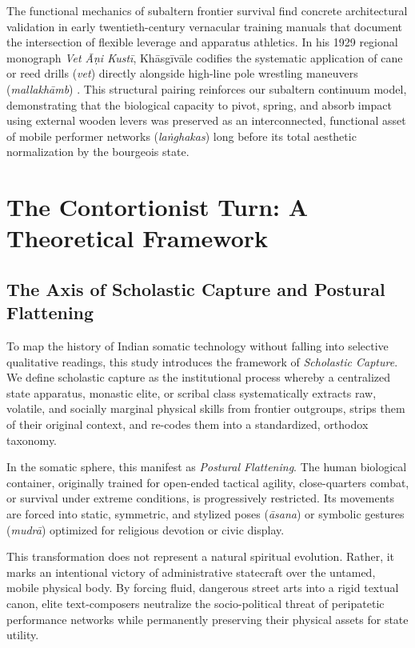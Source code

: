 \documentclass[11pt,twoside,letterpaper]{article}
\begin{document}
The functional mechanics of subaltern frontier survival find concrete architectural validation in early twentieth-century vernacular training manuals that document the intersection of flexible leverage and apparatus athletics. In his 1929 regional monograph \textit{Vet Āṇi Kustī}, Khāsgīvāle codifies the systematic application of cane or reed drills (\textit{vet}) directly alongside high-line pole wrestling maneuvers (\textit{mallakhāmb}) \citep{Khasgivale1929}. This structural pairing reinforces our subaltern continuum model, demonstrating that the biological capacity to pivot, spring, and absorb impact using external wooden levers was preserved as an interconnected, functional asset of mobile performer networks (\textit{laṅghakas}) long before its total aesthetic normalization by the bourgeois state.

\section{The Contortionist Turn: A Theoretical Framework}

\subsection{The Axis of Scholastic Capture and Postural Flattening}
To map the history of Indian somatic technology without falling into selective qualitative readings, this study introduces the framework of \textit{Scholastic Capture}. We define scholastic capture as the institutional process whereby a centralized state apparatus, monastic elite, or scribal class systematically extracts raw, volatile, and socially marginal physical skills from frontier outgroups, strips them of their original context, and re-codes them into a standardized, orthodox taxonomy. 

In the somatic sphere, this manifest as \textit{Postural Flattening}. The human biological container, originally trained for open-ended tactical agility, close-quarters combat, or survival under extreme conditions, is progressively restricted. Its movements are forced into static, symmetric, and stylized poses (\textit{āsana}) or symbolic gestures (\textit{mudrā}) optimized for religious devotion or civic display. 

This transformation does not represent a natural spiritual evolution. Rather, it marks an intentional victory of administrative statecraft over the untamed, mobile physical body. By forcing fluid, dangerous street arts into a rigid textual canon, elite text-composers neutralize the socio-political threat of peripatetic performance networks while permanently preserving their physical assets for state utility.
\end{document}
